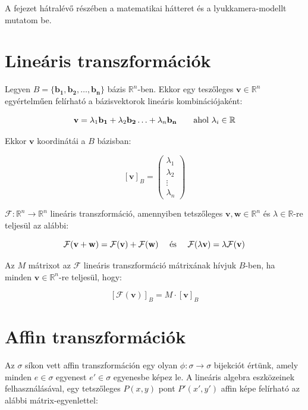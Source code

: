 A fejezet hátralévő részében a matematikai hátteret és a lyukkamera-modellt mutatom be.

\section{Lineáris transzformációk}

Legyen $B = \{\mathbf{b_1}, \mathbf{b_2}, \ldots, \mathbf{b_n}\}$ bázis $\mathbb{R}^n$-ben. Ekkor egy teszőleges $\mathbf{v} \in \mathbb{R}^n$ egyértelműen felírható a bázisvektorok lineáris kombinációjaként:

\[\mathbf{v} = \lambda_1\mathbf{b_1} + \lambda_2\mathbf{b_2} \ldots + \lambda_n\mathbf{b_n} \qquad \hbox{ahol }\lambda_i \in \mathbb{R}\]

Ekkor $\mathbf{v}$ koordinátái a $B$ bázisban:

\[[\mathbf{v}]_B = \left(\begin{array}{c} \lambda_1\\ \lambda_2\\ \vdots\\ \lambda_n\end{array}\right)\]

$\mathcal{F}: \mathbb{R}^n \rightarrow \mathbb{R}^n$ lineáris transzformáció, amennyiben tetszőleges $\mathbf{v}, \mathbf{w} \in \mathbb{R}^n$ és $\lambda \in \mathbb{R}$-re teljesül az alábbi:

\[\mathcal{F}(\mathbf{v} + \mathbf{w}) = \mathcal{F}(\mathbf{v}) + \mathcal{F}(\mathbf{w}) \quad \hbox{ és } \quad \mathcal{F}(\lambda\mathbf{v}) = \lambda\mathcal{F}(\mathbf{v})\]

Az $M$ mátrixot az $\mathcal{F}$  lineáris transzformáció mátrixának hívjuk $B$-ben, ha minden $\mathbf{v}\in \mathbb{R}^n$-re teljesül, hogy:

\[[\mathcal{F}(\mathbf{v})]_B = M \cdot [\mathbf{v}]_B\]

\section{Affin transzformációk}

Az $\sigma$ síkon vett affin transzformáción egy olyan $\phi : \sigma \rightarrow \sigma$ bijekciót értünk, amely minden $e\in\sigma$ egyenest $e'\in\sigma$ egyenesbe képez le. A lineáris algebra eszközeinek felhasználásával, egy tetszőleges $P(x, y)$ pont $P'(x', y')$ affin képe felírható az alábbi mátrix-egyenlettel:

